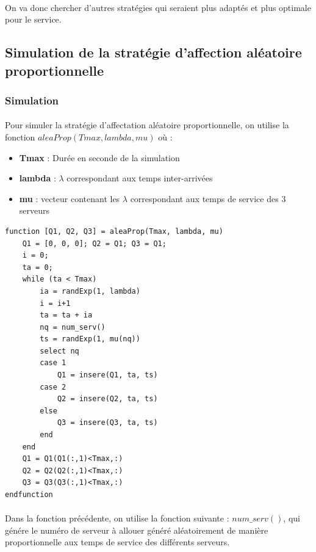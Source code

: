 \documentclass{article}
\begin{document}
\paragraph{}
On va donc chercher d'autres stratégies qui seraient plus adaptés et plus optimale pour le service.

\subsection{Simulation de la stratégie d'affection aléatoire proportionnelle}
\subsubsection{Simulation}

\paragraph{}
Pour simuler la stratégie d'affectation aléatoire proportionnelle, on utilise la fonction $aleaProp(Tmax,lambda,mu)$ où :
\begin{itemize}
	\item \textbf{Tmax} : Durée en seconde de la simulation
	\item \textbf{lambda} : $\lambda$ correspondant aux temps inter-arrivées
	\item \textbf{mu} : vecteur contenant les $\lambda$ correspondant aux temps de service des 3 serveurs
\end{itemize}
\begin{verbatim}
function [Q1, Q2, Q3] = aleaProp(Tmax, lambda, mu)
    Q1 = [0, 0, 0]; Q2 = Q1; Q3 = Q1;
    i = 0;
    ta = 0;
    while (ta < Tmax)
        ia = randExp(1, lambda)
        i = i+1
        ta = ta + ia 
        nq = num_serv() 
        ts = randExp(1, mu(nq))
        select nq
        case 1
            Q1 = insere(Q1, ta, ts)
        case 2 
            Q2 = insere(Q2, ta, ts)
        else
            Q3 = insere(Q3, ta, ts)
        end
    end
    Q1 = Q1(Q1(:,1)<Tmax,:)
    Q2 = Q2(Q2(:,1)<Tmax,:) 
    Q3 = Q3(Q3(:,1)<Tmax,:) 
endfunction 
\end{verbatim}

\paragraph{}
Dans la fonction précédente, on utilise la fonction suivante : $num\_serv()$, qui génére le numéro de serveur à allouer généré aléatoirement de manière proportionnelle aux temps de service des différents serveurs.
\end{document}
